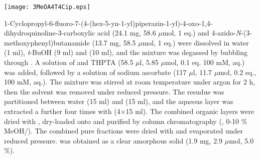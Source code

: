 
\begin{scheme}[H]
	\begin{center}
		\texttt{[image: 3MeOA4T4Cip.eps]}
	\end{center}
\end{scheme}

1-Cyclopropyl-6-fluoro-7-(4-(hex-5-yn-1-yl)piperazin-1-yl)-4-oxo-1,4\hyp{}dihydro\-quinoline-3-carboxylic acid  \allowbreak (24.1 mg, 58.6 $\mu$mol, 1 eq.) and 4\hyp{}azido\hyp{}\textit{N}\hyp{}(3\hyp{}methoxyphenyl)butanamide  (13.7 mg, 58.5 $\mu$mol, 1 eq.) were dissolved in water (1 ml), \textit{t}-BuOH (9 ml) and  (10 ml), and the mixture was degassed by bubbling through . A solution of  and THPTA (58.5 $\mu$l, 5.85 $\mu$mol, 0.1 eq. 100 mM, aq.) was added, followed by a solution of sodium ascorbate (117 $\mu$l, 11.7 $\mu$mol, 0.2 eq., 100 mM, aq.). The mixture was stirred at room temperature under argon for 2 h, then the solvent was removed under reduced pressure. The resudue was partitioned between water (15 ml) and  (15 ml), and the aqueous layer was extracted a further four times with  (4$\times$15 ml). The combined organic layers were dried with , dry-loaded onto  and purified by column chromatography (, 0-10 \% MeOH/). The combined pure fractions were dried with  and evaporated under reduced pressure.  was obtained as a clear amorphous solid (1.9 mg, 2.9 $\mu$mol, 5.0 \%).
\\[1\baselineskip]
\\[1\baselineskip]
\\[1\baselineskip]
